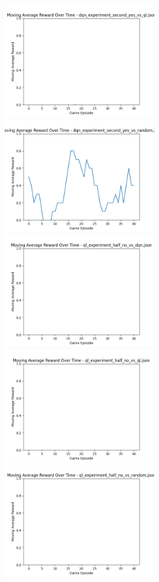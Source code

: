 \includegraphics[width=0.5\textwidth]{images/moving_average_reward_dqn_experiment_second_yes_vs_ql.png} 
\includegraphics[width=0.5\textwidth]{images/moving_average_reward_dqn_experiment_second_yes_vs_random.png} 
\includegraphics[width=0.5\textwidth]{images/moving_average_reward_ql_experiment_half_no_vs_dqn.png} 
\includegraphics[width=0.5\textwidth]{images/moving_average_reward_ql_experiment_half_no_vs_ql.png} 
\includegraphics[width=0.5\textwidth]{images/moving_average_reward_ql_experiment_half_no_vs_random.png} 

